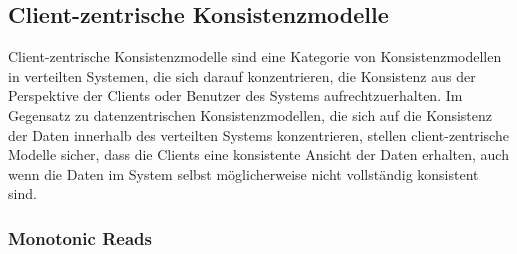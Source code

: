 \documentclass[../vs-script-first-v01.tex]{subfiles}
\begin{document}
\subsection{Client-zentrische Konsistenzmodelle}
Client-zentrische Konsistenzmodelle sind eine Kategorie von Konsistenzmodellen in verteilten Systemen, die sich darauf konzentrieren, die Konsistenz aus der Perspektive der Clients oder Benutzer des Systems aufrechtzuerhalten. Im Gegensatz zu datenzentrischen Konsistenzmodellen, die sich auf die Konsistenz der Daten innerhalb des verteilten Systems konzentrieren, stellen client-zentrische Modelle sicher, dass die Clients eine konsistente Ansicht der Daten erhalten, auch wenn die Daten im System selbst möglicherweise nicht vollständig konsistent sind.

\subsubsection{Monotonic Reads}
\end{document}

